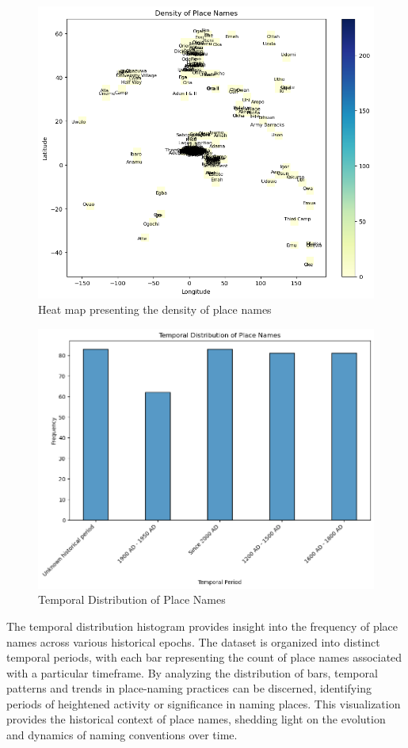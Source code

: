 \begin{figure}[htb]
    \centering
    \includegraphics[width=.8\linewidth]{heatmap1.png}
    \caption{Heat map presenting the density of place names}
    \label{fig:heatmap}
\end{figure}

\begin{figure}[htb]
    \centering
    \includegraphics[width=.8\linewidth]{output2.png}
    \caption{Temporal Distribution of Place Names}
    \label{fig:histgram}
\end{figure}

The temporal distribution histogram provides insight into the frequency of place names across various historical epochs. The dataset is organized into distinct temporal periods, with each bar representing the count of place names associated with a particular timeframe. By analyzing the distribution of bars, temporal patterns and trends in place-naming practices can be discerned, identifying periods of heightened activity or significance in naming places. This visualization provides the historical context of place names, shedding light on the evolution and dynamics of naming conventions over time.

